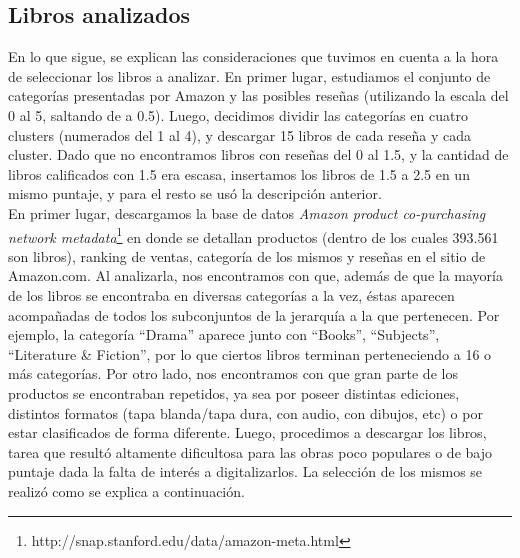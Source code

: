 \documentclass[12pt,journal,compsoc]{IEEEtran}
\begin{document}
\subsection{Libros analizados}
En lo que sigue, se explican las consideraciones que tuvimos en cuenta a la hora de seleccionar los libros a analizar. En primer lugar, estudiamos el conjunto de categorías presentadas por Amazon y las posibles reseñas (utilizando la escala del 0 al 5, saltando de a 0.5). Luego, decidimos dividir las categorías en cuatro clusters (numerados  del 1 al 4), y descargar 15 libros de cada reseña y cada cluster. Dado que no encontramos libros con reseñas del 0 al 1.5, y la cantidad de libros calificados con 1.5 era escasa, insertamos los libros de 1.5 a 2.5 en un mismo puntaje, y para el resto se usó la descripción anterior.\\

En primer lugar, descargamos la base de datos \textit{Amazon product co-purchasing network metadata}\footnote{http://snap.stanford.edu/data/amazon-meta.html} en donde se detallan productos (dentro de los cuales 393.561 son libros), ranking de ventas, categoría de los mismos y reseñas en el sitio de Amazon.com. Al analizarla, nos encontramos con que, además de que la mayoría de los libros se encontraba en diversas categorías a la vez, éstas aparecen acompañadas de todos los subconjuntos de la jerarquía a la que pertenecen. Por ejemplo, la categoría ``Drama'' aparece junto con ``Books'', ``Subjects'', ``Literature \& Fiction'', por lo que ciertos libros terminan perteneciendo a 16 o más categorías. Por otro lado, nos encontramos con que gran parte de los productos se encontraban repetidos, ya sea por poseer distintas ediciones, distintos formatos (tapa blanda/tapa dura, con audio, con dibujos, etc) o por estar clasificados de forma diferente. 
Luego, procedimos a descargar los libros, tarea que resultó altamente dificultosa para las obras poco populares o de bajo puntaje dada la falta de interés a digitalizarlos. La selección de los mismos se realizó como se explica a continuación.
\end{document}
